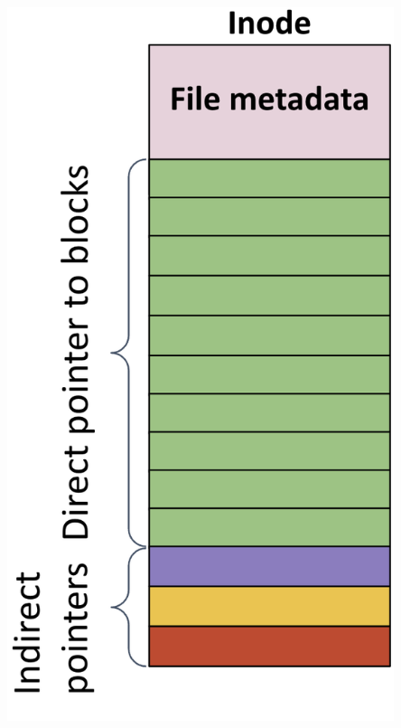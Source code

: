 \begin{minipage}{0.35\textwidth}
  \begin{center}
    \includegraphics[width=0.85\textwidth]{chapters/L7/images/inode.png}
  \end{center}
\end{minipage}
 
